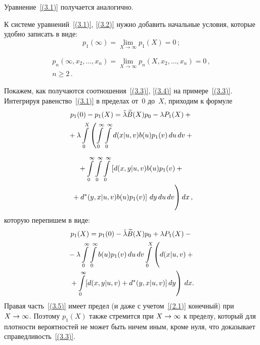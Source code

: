 \begin{multicols}{2}
Уравнение~\eqref{(3.1)} получается аналогично.

К системе уравнений~\eqref{(3.1)},
\eqref{(3.2)} нужно добавить начальные условия,
которые удобно записать в виде:
\begin{equation}
\label{(3.3)}
p_{1}(\infty) = \lim\limits_{X\to \infty}
p_{1}(X) = 0\,;                         %
\end{equation}

\vspace*{-12pt}

\noindent
\begin{multline}
p_{n}(\infty,x_2,\ldots,x_n) = \lim\limits_{X\to \infty}
p_{n}(X,x_2,\ldots,x_n) = 0\,,\\  n\ge 2\,.
\label{(3.4)}
\end{multline}

Покажем, как получаются соотношения~\eqref{(3.3)}, \eqref{(3.4)}
на примере~\eqref{(3.3)}.
Интегрируя равенство~\eqref{(3.1)} в пределах
от~0 до~$X$, приходим к формуле
\begin{multline*}
p_1(0) - p_1(X) = \tilde\lambda \widetilde B(X) p_0 - \lambda P_1(X)
+ {}\\
{}+\lambda \int\limits_0^X \left(
\int\limits_0^\infty
\int\limits_0^\infty
d(x|u,v) b(u) p_1(v)
\,du\,dv
+{}\right.
\end{multline*}

\noindent
\begin{multline*}
{}+
\int\limits_0^\infty
\int\limits_0^\infty
\int\limits_0^\infty
\left[d(x,y|u,v) b(u) p_1(v)
+{}\right.\\
\left.\left.{}+
d^*(y,x|u,v) b(u) p_1(v)\right]
\,dy\,du\,dv \vphantom{\int\limits_0^\infty}
\right) dx\,,
\end{multline*}
которую перепишем в виде:
\begin{multline}
\label{(3.5)}
p_1(X) = p_1(0) - \tl \tB(X) p_0
+ \lambda P_1(X) - {}\\
{}-\lambda \int\limits_0^\infty
\int\limits_0^\infty b(u) p_1(v)
\,du\,dv \int\limits_0^X
\left( \vphantom{\int\limits_0^\infty}
d(x|u,v)
+{}\right.\\
\left.{}+
\int\limits_0^\infty
[d(x,y|u,v) + d^*(y,x|u,v) ]\,dy
\right)\,dx.                         %
\end{multline}
Правая часть~\eqref{(3.5)} имеет предел
(и даже с учетом~\eqref{(2.1)} конечный)
при $X\hm\to\infty$.
Поэтому $p_1(X)$ также стремится при
$X\hm\to\infty$ к пределу, который для плотности
вероятностей не может быть ничем иным, кроме
нуля, что доказывает справедливость~\eqref{(3.3)}.


\end{multicols}
